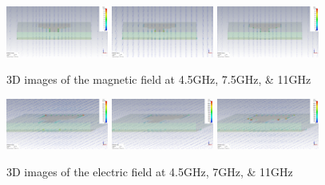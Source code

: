 \documentclass[colorlinks,11pt,a4paper,normalphoto,withhyper,ragged2e]{altareport}
\begin{document}
\begin{figure}[ht!]
\centering

		\includegraphics[width=0.3\textwidth]{Images/mag-field-4.5GHz.png}
    	\hfill
		\includegraphics[width=0.3\textwidth]{Images/mag-field-7.5GHz.png}
		\hfill
		\includegraphics[width=0.3\textwidth]{Images/mag-field-11GHz.png}
	\caption{3D images of the magnetic field at 4.5GHz, 7.5GHz, \& 11GHz}\label{fig:mag_field}
\end{figure}

\vspace{5mm}

\begin{figure}[ht!]
\centering

		\includegraphics[width=0.3\textwidth]{Images/elec-field-4.5GHz.png}
    	\hfill
		\includegraphics[width=0.3\textwidth]{Images/elec-field-7GHz.png}
		\hfill
		\includegraphics[width=0.3\textwidth]{Images/elec-field-11GHz.png}
	\caption{3D images of the electric field at 4.5GHz, 7GHz, \& 11GHz}\label{fig:electric_field}
\end{figure}
\end{document}
